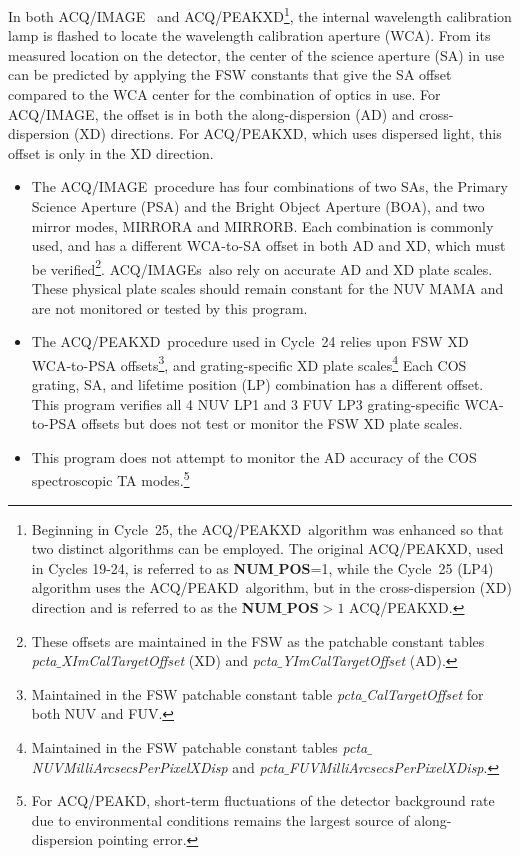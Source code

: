 \documentclass[12pt]{reportj}
\newcommand*{\myfont}{\fontfamily{rm}\selectfont}
\def\numpos{{\bf NUM$\_$POS}\rm}
\def\acqimage{{\myfont ACQ/IMAGE}\rm}
\def\acqimages{{\myfont ACQ/IMAGE{\rm s}}\rm}
\def\acqpeakd{{\myfont ACQ/PEAKD}\rm}
\def\acqpeakxd{{\myfont ACQ/PEAKXD}\rm}
\begin{document}
In both \acqimage~ and \acqpeakxd\footnote{Beginning in Cycle~25, the \acqpeakxd~algorithm was enhanced so that two distinct algorithms can be employed.
The original \acqpeakxd, used in Cycles 19-24, is referred to as \numpos=1, while the Cycle~25 (LP4) algorithm
uses the \acqpeakd~algorithm, but in the cross-dispersion (XD) direction and is referred to as the \numpos $ > 1$ \acqpeakxd.},
 the internal wavelength calibration lamp is flashed to locate the wavelength calibration aperture (WCA). From its measured location on the detector, the center of the science aperture (SA) in use can be predicted by applying the FSW constants that give the SA offset compared to the WCA center for the combination of optics in use.
For \acqimage, the offset is in both the along-dispersion (AD) and cross-dispersion (XD) directions. For \acqpeakxd, which uses dispersed light, this offset is only in the XD direction.
\begin{itemize}
\item{
The \acqimage~procedure has four combinations of two SAs, the Primary Science Aperture (PSA) and the Bright Object Aperture (BOA), and two mirror modes, MIRRORA and MIRRORB. Each combination is commonly used, and has a different WCA-to-SA offset in both AD and XD, which must be verified\footnote{These offsets are maintained in the FSW as the patchable constant tables {\it pcta$\_$XImCalTargetOffset} (XD) and {\it pcta$\_$YImCalTargetOffset} (AD).}. \acqimages~also rely on accurate AD and XD plate scales. These physical plate scales should remain constant for the NUV MAMA and are not monitored or tested by this program.
}
\item{
The \acqpeakxd~procedure used in Cycle~24 relies upon FSW XD WCA-to-PSA offsets\footnote{Maintained in the FSW patchable constant table {\it pcta$\_$CalTargetOffset} for both NUV and FUV.}, and grating-specific XD plate scales\footnote{Maintained in the FSW patchable constant tables {\it pcta$\_$NUVMilliArcsecsPerPixelXDisp} and {\it pcta$\_$FUVMilliArcsecsPerPixelXDisp}.}
Each COS grating, SA, and lifetime position (LP) combination has a different offset. This program verifies all 4 NUV LP1 and 3 FUV LP3 grating-specific WCA-to-PSA offsets but does not test or monitor the FSW XD plate scales.
}
\item{
This program does not attempt to monitor the AD accuracy of the COS spectroscopic TA modes.\footnote{For \acqpeakd, short-term fluctuations of the detector background rate due to environmental conditions remains the largest source of along-dispersion pointing error.}
}
\end{itemize}
\end{document}
